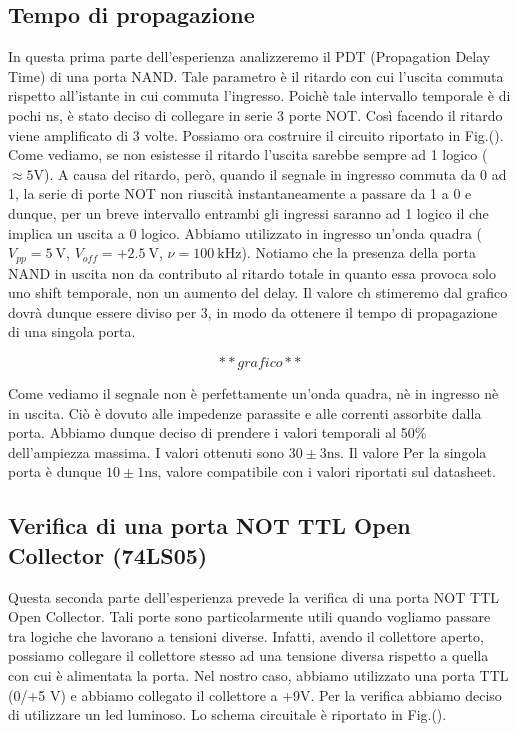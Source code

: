 \subsection*{Tempo di propagazione}
In questa prima parte dell'esperienza analizzeremo il PDT (Propagation Delay Time) di una porta NAND. Tale parametro è il ritardo con cui l'uscita commuta rispetto all'istante in cui commuta l'ingresso. Poichè tale intervallo temporale è di pochi \si{\nano\second}, è stato deciso di collegare in serie 3 porte NOT. Così facendo il ritardo viene amplificato di 3 volte. Possiamo ora costruire il circuito riportato in Fig.(). Come vediamo, se non esistesse il ritardo l'uscita sarebbe sempre ad 1 logico ($\approx 5 \si{\volt}$). A causa del ritardo, però, quando il segnale in ingresso commuta da 0 ad 1, la serie di porte NOT non riuscità instantaneamente a passare da 1 a 0 e dunque, per un breve intervallo entrambi gli ingressi saranno ad 1 logico il che implica un uscita a 0 logico. Abbiamo utilizzato in ingresso un'onda quadra ($V_{pp}=\SI{5}{\volt}$, $V_{off}=+\SI{2.5}{\volt}$, $\nu=\SI{100}{\kilo\hertz}$). Notiamo che la presenza della porta NAND in uscita non da contributo al ritardo totale in quanto essa provoca solo uno shift temporale, non un aumento del delay. Il valore ch stimeremo dal grafico dovrà dunque essere diviso per 3, in modo da ottenere il tempo di propagazione di una singola porta. 

$$**grafico**$$ 


Come vediamo il segnale non è perfettamente un'onda quadra, nè in ingresso nè in uscita. Ciò è dovuto alle impedenze parassite e alle correnti assorbite dalla porta. Abbiamo dunque deciso di prendere i valori temporali al 50\% dell'ampiezza massima. I valori ottenuti sono $30\pm 3 \si{\nano\second}$. Il valore Per la singola porta è dunque $10\pm 1 \si{\nano\second}$, valore compatibile con i valori riportati sul datasheet.


\subsection*{Verifica di una porta NOT TTL Open Collector (74LS05)}

Questa seconda parte dell'esperienza prevede la verifica di una porta NOT TTL Open Collector. Tali porte sono particolarmente utili quando vogliamo passare tra logiche che lavorano a tensioni diverse. Infatti, avendo il collettore aperto, possiamo collegare il collettore stesso ad una tensione diversa rispetto a quella con cui è alimentata la porta. Nel nostro caso, abbiamo utilizzato una porta TTL (0/+5 \si{\volt}) e abbiamo collegato il collettore a +9\si{\volt}. Per la verifica abbiamo deciso di utilizzare un led luminoso. Lo schema circuitale è riportato in Fig.().

